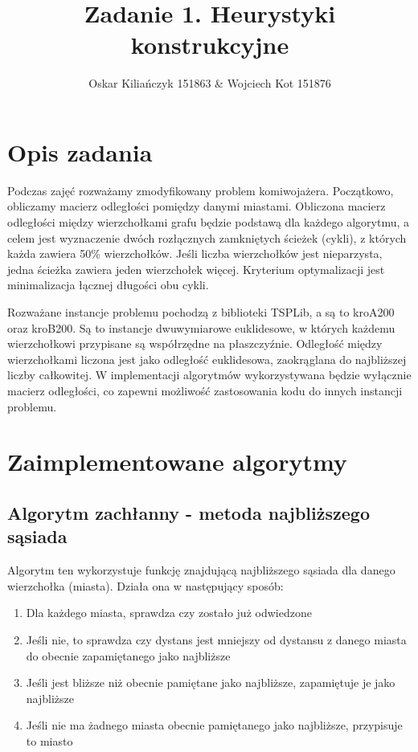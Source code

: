 \documentclass[11pt]{article}
\title{Zadanie 1. Heurystyki konstrukcyjne}
\author{Oskar Kiliańczyk 151863 \& Wojciech Kot 151876}
\date{}
\begin{document}
\maketitle
\newpage

\section{Opis zadania}\label{sec:opis-zadania}

Podczas zajęć rozważamy zmodyfikowany problem komiwojażera.
Początkowo, obliczamy macierz odległości pomiędzy danymi miastami.
Obliczona macierz odległości między wierzchołkami grafu będzie podstawą dla każdego algorytmu,
a celem jest wyznaczenie dwóch rozłącznych zamkniętych ścieżek (cykli), z których każda zawiera 50\% wierzchołków.
Jeśli liczba wierzchołków jest nieparzysta, jedna ścieżka zawiera jeden wierzchołek więcej.
Kryterium optymalizacji jest minimalizacja łącznej długości obu cykli.

Rozważane instancje problemu pochodzą z biblioteki TSPLib, a są to kroA200 oraz kroB200.
Są to instancje dwuwymiarowe euklidesowe, w których każdemu wierzchołkowi przypisane są współrzędne na płaszczyźnie.
Odległość między wierzchołkami liczona jest jako odległość euklidesowa, zaokrąglana do najbliższej liczby całkowitej.
W implementacji algorytmów wykorzystywana będzie wyłącznie macierz odległości, co zapewni możliwość zastosowania kodu do innych instancji problemu.

\section{Zaimplementowane algorytmy}\label{sec:zaimplementowane-algorytmy}

\subsection{Algorytm zachłanny - metoda najbliższego sąsiada}\label{subsec:algorytm-zachanny---metoda-najblizszego-sasiada}

Algorytm ten wykorzystuje funkcję znajdującą najbliższego sąsiada dla danego wierzchołka (miasta).
Działa ona w następujący sposób:
\begin{enumerate}
\item Dla każdego miasta, sprawdza czy zostało już odwiedzone
\item Jeśli nie, to sprawdza czy dystans jest mniejszy od dystansu z danego miasta do obecnie zapamiętanego jako najbliższe
\item Jeśli jest bliższe niż obecnie pamiętane jako najbliższe, zapamiętuje je jako najbliższe
\item Jeśli nie ma żadnego miasta obecnie pamiętanego jako najbliższe, przypisuje to miasto
\end{enumerate}
\end{document}
